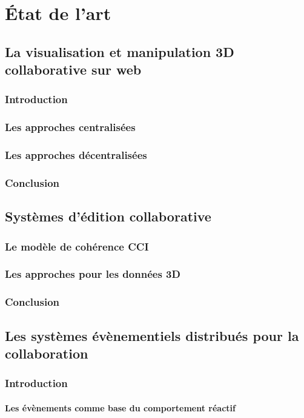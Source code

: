 \documentclass[final,10pt,doubleside]{book}
\begin{document}
\chapter{État de l'art}

\section{La visualisation et manipulation 3D collaborative sur web}
	\subsection{Introduction}
	\subsection{Les approches centralisées}
	\subsection{Les approches décentralisées}
	\subsection{Conclusion}

\section{Systèmes d'édition collaborative}
	\subsection{Le modèle de cohérence CCI}
	\subsection{Les approches pour les données 3D}
	\subsection{Conclusion}


\section{Les systèmes évènementiels distribués pour la collaboration}

	\subsection{Introduction}
		\subsubsection{Les évènements comme base du comportement réactif}
\end{document}
